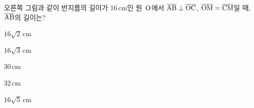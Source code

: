 \noindent\begin{minipage}[t]{0.58\linewidth}\vspace{0pt}\raggedright 오른쪽 그림과 같이 반지름의 길이가 $16\,\mathrm{cm}$인 원~$\mathrm{O}$에서 $\overline{\mathrm{AB}}\perp\overline{\mathrm{OC}}$, $\overline{\mathrm{OM}}=\overline{\mathrm{CM}}$일 때, $\overline{\mathrm{AB}}$의 길이는?\end{minipage}\hfill\begin{minipage}[t]{0.4\linewidth}\vspace{0pt}\centering \resizebox{\ifdim\width>\linewidth\linewidth\else\width\fi}{!}{}\end{minipage}\par
\begin{choicesii}{\rule[-3ex]{0pt}{8ex}$16\sqrt{2}\,\mathrm{cm}$}{\rule[-3ex]{0pt}{8ex}$16\sqrt{3}\,\mathrm{cm}$}{\rule[-3ex]{0pt}{8ex}$30\,\mathrm{cm}$}{\rule[-3ex]{0pt}{8ex}$32\,\mathrm{cm}$}{\rule[-3ex]{0pt}{8ex}$16\sqrt{5}\,\mathrm{cm}$}\end{choicesii}
